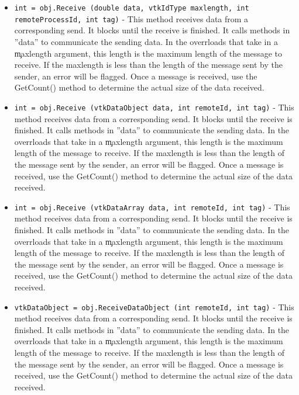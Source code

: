 \begin{itemize}
\item  \verb|int = obj.Receive (double data, vtkIdType maxlength, int remoteProcessId, int tag)| -  This method receives data from a corresponding send. It blocks
 until the receive is finished.  It calls methods in ''data''
 to communicate the sending data. In the overrloads that take in a \c
 maxlength argument, this length is the maximum length of the message to
 receive. If the maxlength is less than the length of the message sent by
 the sender, an error will be flagged. Once a message is received, use the
 GetCount() method to determine the actual size of the data received.

\item  \verb|int = obj.Receive (vtkDataObject data, int remoteId, int tag)| -  This method receives data from a corresponding send. It blocks
 until the receive is finished.  It calls methods in ''data''
 to communicate the sending data. In the overrloads that take in a \c
 maxlength argument, this length is the maximum length of the message to
 receive. If the maxlength is less than the length of the message sent by
 the sender, an error will be flagged. Once a message is received, use the
 GetCount() method to determine the actual size of the data received.

\item  \verb|int = obj.Receive (vtkDataArray data, int remoteId, int tag)| -  This method receives data from a corresponding send. It blocks
 until the receive is finished.  It calls methods in ''data''
 to communicate the sending data. In the overrloads that take in a \c
 maxlength argument, this length is the maximum length of the message to
 receive. If the maxlength is less than the length of the message sent by
 the sender, an error will be flagged. Once a message is received, use the
 GetCount() method to determine the actual size of the data received.

\item  \verb|vtkDataObject = obj.ReceiveDataObject (int remoteId, int tag)| -  This method receives data from a corresponding send. It blocks
 until the receive is finished.  It calls methods in ''data''
 to communicate the sending data. In the overrloads that take in a \c
 maxlength argument, this length is the maximum length of the message to
 receive. If the maxlength is less than the length of the message sent by
 the sender, an error will be flagged. Once a message is received, use the
 GetCount() method to determine the actual size of the data received.


\end{itemize}
